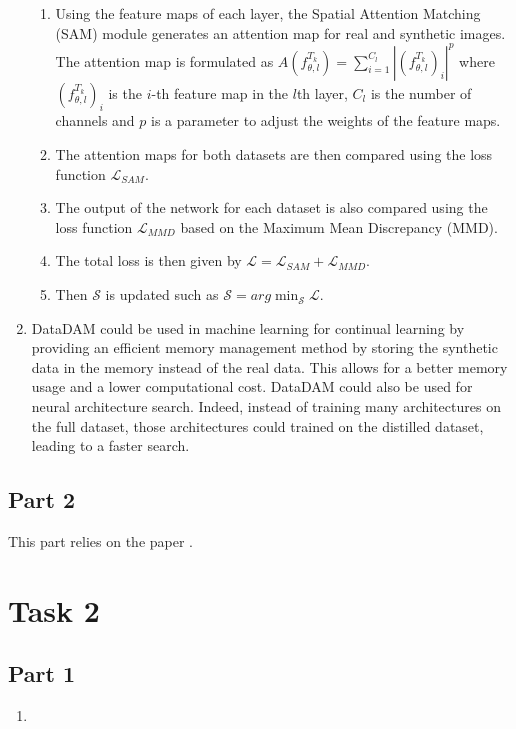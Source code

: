 \documentclass[onecolumn]{IEEEtran}
\begin{document}
\begin{enumerate}[label=(\alph*)]
\begin{enumerate}[label=(\arabic*)]
        \item Using the feature maps of each layer, the Spatial Attention Matching (SAM) module generates an attention map for real and synthetic images. The attention map is formulated as $A(f_{\theta,l}^{T_k}) = \sum_{i=1}^{C_l} | (f_{\theta,l}^{T_k})_i|^p$ where $(f_{\theta,l}^{T_k})_i$ is the $i$-th feature map in the $l$th layer, $C_l$ is the number of channels and $p$ is a parameter to adjust the weights of the feature maps.
        \item The attention maps for both datasets are then compared using the loss function $\mathcal{L}_{SAM}$.
        \item The output of the network for each dataset is also compared using the loss function $\mathcal{L}_{MMD}$ based on the Maximum Mean Discrepancy (MMD).
        \item The total loss is then given by $\mathcal{L} = \mathcal{L}_{SAM} + \mathcal{L}_{MMD}$.
        \item Then $\mathcal{S}$ is updated such as $\mathcal{S} = arg \min_{\mathcal{S}} \mathcal{L}$.
    \end{enumerate}
    \vspace{3mm}
    \item DataDAM could be used in machine learning for continual learning by providing an efficient memory management method by storing the synthetic data in the memory instead of the real data. This allows for a better memory usage and a lower computational cost. DataDAM could also be used for neural architecture search. Indeed, instead of training many architectures on the full dataset, those architectures could trained on the distilled dataset, leading to a faster search.
\end{enumerate}

\subsection{Part 2}
This part relies on the paper \cite{li2024prioritize}.

\section{Task 2}
\subsection{Part 1}
\begin{enumerate}[label=(\alph*)]
    \item 
\end{enumerate}



\end{document}
